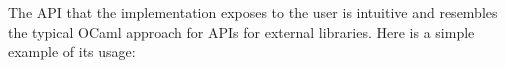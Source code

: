 \documentclass[12pt,twoside,notitlepage]{report}
\begin{document}
The API that the implementation exposes to the user is intuitive and resembles the typical OCaml approach for APIs for external libraries. Here is a simple example of its usage:


\newpage
\end{document}
